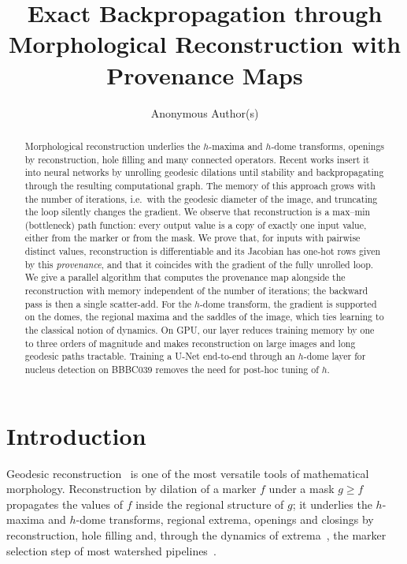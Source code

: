 \documentclass[runningheads]{llncs}
\begin{document}
\title{Exact Backpropagation through Morphological Reconstruction with Provenance Maps}
\author{Anonymous Author(s)}
\maketitle

\begin{abstract}
Morphological reconstruction underlies the $h$-maxima and $h$-dome transforms, openings by reconstruction, hole filling and many connected operators. Recent works insert it into neural networks by unrolling geodesic dilations until stability and backpropagating through the resulting computational graph. The memory of this approach grows with the number of iterations, i.e.\ with the geodesic diameter of the image, and truncating the loop silently changes the gradient. We observe that reconstruction is a max--min (bottleneck) path function: every output value is a copy of exactly one input value, either from the marker or from the mask. We prove that, for inputs with pairwise distinct values, reconstruction is differentiable and its Jacobian has one-hot rows given by this \emph{provenance}, and that it coincides with the gradient of the fully unrolled loop. We give a parallel algorithm that computes the provenance map alongside the reconstruction with memory independent of the number of iterations; the backward pass is then a single scatter-add. For the $h$-dome transform, the gradient is supported on the domes, the regional maxima and the saddles of the image, which ties learning to the classical notion of dynamics. On GPU, our layer reduces training memory by one to three orders of magnitude and makes reconstruction on large images and long geodesic paths tractable. Training a U-Net end-to-end through an $h$-dome layer for nucleus detection on BBBC039 removes the need for post-hoc tuning of $h$.
\end{abstract}

\section{Introduction}
Geodesic reconstruction~\cite{vincent1993,soille2003} is one of the most versatile tools of mathematical morphology. Reconstruction by dilation of a marker $f$ under a mask $g\ge f$ propagates the values of $f$ inside the regional structure of $g$; it underlies the $h$-maxima and $h$-dome transforms, regional extrema, openings and closings by reconstruction, hole filling and, through the dynamics of extrema~\cite{grimaud1992}, the marker selection step of most watershed pipelines~\cite{naylor2019}.
\end{document}
